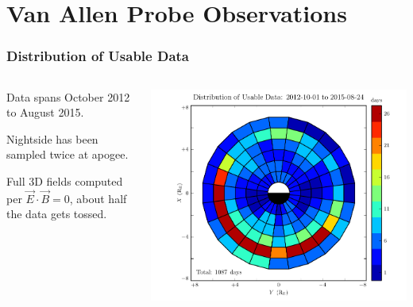 \documentclass{beamer}
\begin{document}

\section{Van Allen Probe Observations}


\begin{frame}
\frametitle{Distribution of Usable Data}


\begin{columns}
\begin{wideitemize}
\item Data spans October 2012 to August 2015. 
\item Nightside has been sampled twice at apogee. 
\item Full 3D fields computed per $\vec{E} \cdot \vec{B} = 0$, about half the data gets tossed.
\end{wideitemize}
\includegraphics[width=\textwidth]{figures/pos_all_sharp.pdf}
\end{columns}

\end{frame}
\end{document}
